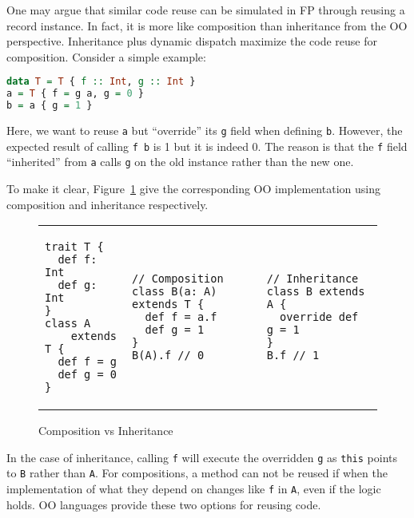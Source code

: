 One may argue that similar code reuse can be simulated in FP through reusing a record instance.
In fact, it is more like composition than inheritance from the OO perspective.
Inheritance plus dynamic dispatch maximize the code reuse for composition.
Consider a simple example:

\begin{lstlisting}[language=haskell]
data T = T { f :: Int, g :: Int }
a = T { f = g a, g = 0 }
b = a { g = 1 }
\end{lstlisting}
Here, we want to reuse \lstinline{a} but ``override'' its \lstinline{g} field when defining \lstinline{b}.
However, the expected result of calling \lstinline{f b} is 1 but it is indeed 0.
The reason is that the \lstinline{f} field ``inherited'' from \lstinline{a} calls
\lstinline{g} on the old instance rather than the new one.

To make it clear, Figure~\ref{code:compare} give the corresponding OO implementation using composition
and inheritance respectively.
\begin{figure}
\setlength{\tabcolsep}{1pt}
\begin{tabular}{lll}
\begin{minipage}[b]{.15\textwidth}
\begin{lstlisting}
trait T {
  def f: Int
  def g: Int
}
class A
    extends T {
  def f = g
  def g = 0
}
\end{lstlisting}
\end{minipage}
&
\begin{minipage}[b]{.15\textwidth}
\begin{lstlisting}
// Composition
class B(a: A) extends T {
  def f = a.f
  def g = 1
}
B(A).f // 0
\end{lstlisting}
\end{minipage}
&
\begin{minipage}[b]{.2\textwidth}
\begin{lstlisting}
// Inheritance
class B extends A {
  override def g = 1
}
B.f // 1
\end{lstlisting}
\end{minipage}
\end{tabular}
\caption{Composition vs Inheritance}
\label{code:compare}
\end{figure}
In the case of inheritance, calling \lstinline{f} will execute the overridden \lstinline{g}
as \lstinline{this} points to \lstinline{B} rather than \lstinline{A}.
For compositions, a method can not be reused if when the implementation of what
they depend on changes like \lstinline{f} in \lstinline{A}, even if the logic holds.
OO languages provide these two options for reusing code.

